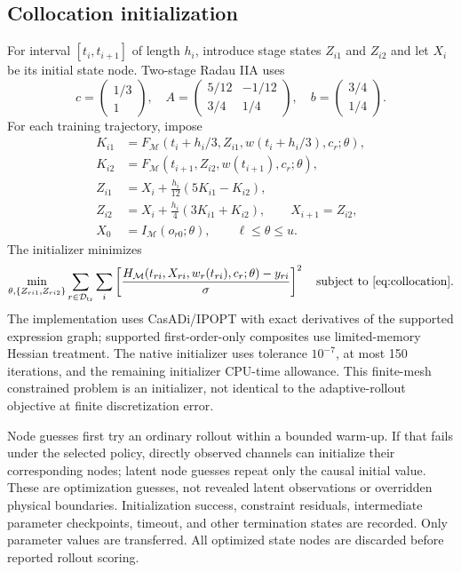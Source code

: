 \documentclass[11pt]{article}
\newcommand{\Dtr}{\mathcal{D}_{\mathrm{tr}}}
\newcommand{\M}{\mathcal{M}}
\begin{document}
\subsection{Collocation initialization}
For interval $[t_i,t_{i+1}]$ of length $h_i$, introduce stage states
$Z_{i1}$ and $Z_{i2}$ and let $X_i$ be its initial state node. Two-stage Radau IIA
uses
\begin{equation}
 c=\begin{pmatrix}1/3\\1\end{pmatrix},\quad
 A=\begin{pmatrix}5/12&-1/12\\3/4&1/4\end{pmatrix},\quad
 b=\begin{pmatrix}3/4\\1/4\end{pmatrix}.
\end{equation}
For each training trajectory, impose
\begin{subequations}\label{eq:collocation}
\begin{align}
 K_{i1}&=F_{\M}(t_i+h_i/3,Z_{i1},w(t_i+h_i/3),c_r;\theta),\\
 K_{i2}&=F_{\M}(t_{i+1},Z_{i2},w(t_{i+1}),c_r;\theta),\\
 Z_{i1}&=X_i+\frac{h_i}{12}(5K_{i1}-K_{i2}),\\
 Z_{i2}&=X_i+\frac{h_i}{4}(3K_{i1}+K_{i2}),\qquad X_{i+1}=Z_{i2},\\
 X_0&=I_{\M}(o_{r0};\theta),\qquad \ell\leq\theta\leq u.
\end{align}
\end{subequations}
The initializer minimizes
\begin{equation}
 \min_{\theta,\{Z_{ri1},Z_{ri2}\}}
 \sum_{r\in\Dtr}\sum_i
 \left[\frac{H_{\M}(t_{ri},X_{ri},w_r(t_{ri}),c_r;\theta)-y_{ri}}
 {\sigma}\right]^2
 \quad\text{subject to \eqref{eq:collocation}}.
 \label{eq:colloc-objective}
\end{equation}
The implementation uses CasADi/IPOPT with exact derivatives of the supported
expression graph; supported first-order-only composites use limited-memory
Hessian treatment. The native initializer uses tolerance $10^{-7}$, at most
150 iterations, and the remaining initializer CPU-time allowance. This
finite-mesh constrained problem is an initializer, not
identical to the adaptive-rollout objective at finite discretization error.

Node guesses first try an ordinary rollout within a bounded warm-up. If that
fails under the selected policy, directly observed channels can initialize their
corresponding nodes; latent node guesses repeat only the causal initial value.
These are optimization guesses, not revealed latent observations or overridden
physical boundaries. Initialization success, constraint residuals, intermediate
parameter checkpoints, timeout, and other termination states are recorded.
Only parameter values are transferred. All optimized state nodes are discarded
before reported rollout scoring.
\end{document}
